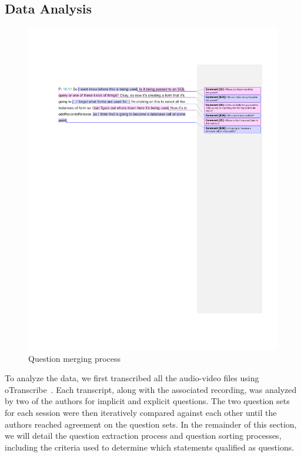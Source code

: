 \documentclass{sig-alternate}
\begin{document}
\subsection{Data Analysis}
\begin{figure}
	\centering
	\includegraphics[trim={0 0 0 3mm},clip, width=\textwidth]{Images/QuestionMerging}
	\caption{Question merging process}
	\label{fig:merging} 
\end{figure}

\label{dataAnalysis}
To analyze the data, we first transcribed all the audio-video files using oTranscribe~\cite{OTranscribe}.
Each transcript, along with the associated recording, was analyzed by two of the authors for implicit and explicit questions. 
The two question sets for each session were then iteratively compared against each other until the authors reached agreement on the question sets. 
In the remainder of this section, we will detail the question extraction process and question sorting processes, including the criteria used to determine which statements qualified as questions.
\end{document}

